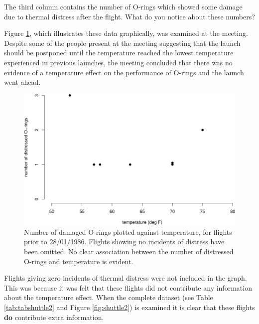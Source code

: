 \documentclass[
  11pt,
  british,
  openany, a4paper]{book}
\begin{document}
The third column contains the number of O-rings which showed some damage due to
thermal distress after the flight. What do you notice about these numbers?

Figure \ref{fig:shuttle1}, which illustrates these data graphically, was examined at the meeting. Despite some of the people present at the meeting suggesting that the launch should be postponed until the temperature reached the lowest temperature experienced in previous launches, the meeting concluded that there was no evidence of a temperature effect on the performance of O-rings and the launch went ahead.

\begin{figure}

{\centering \includegraphics[width=0.75\linewidth]{images/shuttle1} 

}

\caption{Number of damaged O-rings plotted against temperature, for flights prior to 28/01/1986. Flights showing no incidents of distress have been omitted.  No clear association between the number of distressed O-rings and temperature is evident.}\label{fig:shuttle1}
\end{figure}

Flights giving zero incidents of thermal distress were not included in the graph. This was because it was felt that these flights did not contribute any information about the temperature effect. When the complete dataset (see Table \ref{tab:tabshuttle2} and Figure \ref{fig:shuttle2}) is examined it is clear that these flights \textbf{do} contribute extra information.
\end{document}
